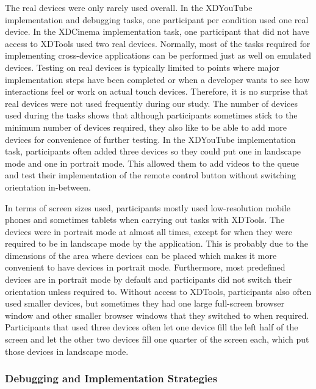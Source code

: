 The real devices were only rarely used overall. In the XDYouTube implementation and debugging tasks, one participant per condition used one real device. In the XDCinema implementation task, one participant that did not have access to XDTools used two real devices. Normally, most of the tasks required for implementing cross-device applications can be performed just as well on emulated devices. Testing on real devices is typically limited to points where major implementation steps have been completed or when a developer wants to see how interactions feel or work on actual touch devices. Therefore, it is no surprise that real devices were not used frequently during our study. The number of devices used during the tasks shows that although participants sometimes stick to the minimum number of devices required, they also like to be able to add more devices for convenience of further testing. In the XDYouTube implementation task, participants often added three devices so they could put one in landscape mode and one in portrait mode. This allowed them to add videos to the queue and test their implementation of the remote control button without switching orientation in-between. 

In terms of screen sizes used, participants mostly used low-resolution mobile phones and sometimes tablets when carrying out tasks with XDTools. The devices were in portrait mode at almost all times, except for when they were required to be in landscape mode by the application. This is probably due to the dimensions of the area where devices can be placed which makes it more convenient to have devices in portrait mode. Furthermore, most predefined devices are in portrait mode by default and participants did not switch their orientation unless required to. Without access to XDTools, participants also often used smaller devices, but sometimes they had one large full-screen browser window and other smaller browser windows that they switched to when required. Participants that used three devices often let one device fill the left half of the screen and let the other two devices fill one quarter of the screen each, which put those devices in landscape mode. 

\subsubsection{Debugging and Implementation Strategies}

